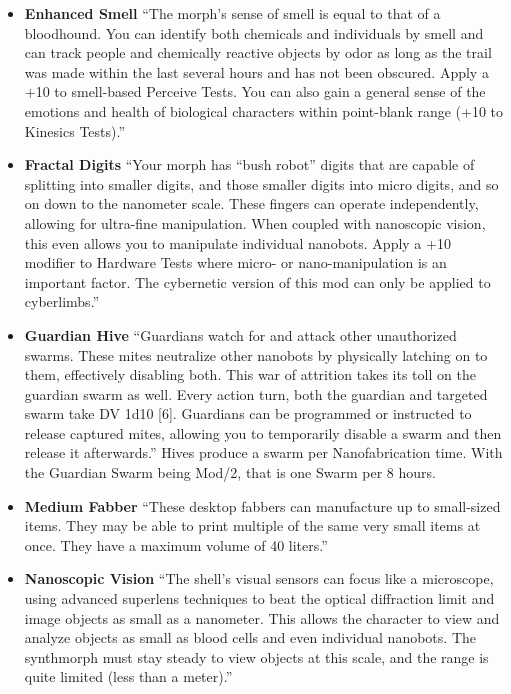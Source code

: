 \begin{itemize}
    \item \textbf{Enhanced Smell} “The morph’s sense of smell is equal to that of a bloodhound. You can identify both chemicals and individuals by smell and can track people and chemically reactive objects by odor as long as the trail was made within the last several hours and has not been obscured. Apply a +10 to smell-based Perceive Tests. You can also gain a general sense of the emotions and health of biological characters within point-blank range (+10 to Kinesics Tests).” \citep[pg. 318]{ep2e_1.1_2019}

    \item \textbf{Fractal Digits} “Your morph has “bush robot” digits that are capable of splitting into smaller digits, and those smaller digits into micro digits, and so on down to the nanometer scale. These fingers can operate independently, allowing for ultra-fine manipulation. When coupled with nanoscopic vision, this even allows you to manipulate individual nanobots. Apply a +10 modifier to Hardware Tests where micro- or nano-manipulation is an important factor. The cybernetic version of this mod can only be applied to cyberlimbs.” \citep[pg. 324]{ep2e_1.1_2019}

    \item \textbf{Guardian Hive} “Guardians watch for and attack other unauthorized swarms. These mites neutralize other nanobots by physically latching on to them, effectively disabling both. This war of attrition takes its toll on the guardian swarm as well. Every action turn, both the guardian and targeted swarm take DV 1d10 [6]. Guardians can be programmed or instructed to release captured mites, allowing you to temporarily disable a swarm and then release it afterwards.” \citep[pg. 345]{ep2e_1.1_2019} Hives produce a swarm per Nanofabrication time. With the Guardian Swarm being Mod/2, that is one Swarm per 8 hours.

    \item \textbf{Medium Fabber} “These desktop fabbers can manufacture up to small-sized items. They may be able to print multiple of the same very small items at once. They have a maximum volume of 40 liters.” \citep[pg. 343]{ep2e_1.1_2019}

    \item \textbf{Nanoscopic Vision} “The shell’s visual sensors can focus like a microscope, using advanced superlens techniques to beat the optical diffraction limit and image objects as small as a nanometer. This allows the character to view and analyze objects as small as blood cells and even individual nanobots. The synthmorph must stay steady to view objects at this scale, and the range is quite limited (less than a meter).” \citep[pg. 318]{ep2e_1.1_2019}


\end{itemize}
